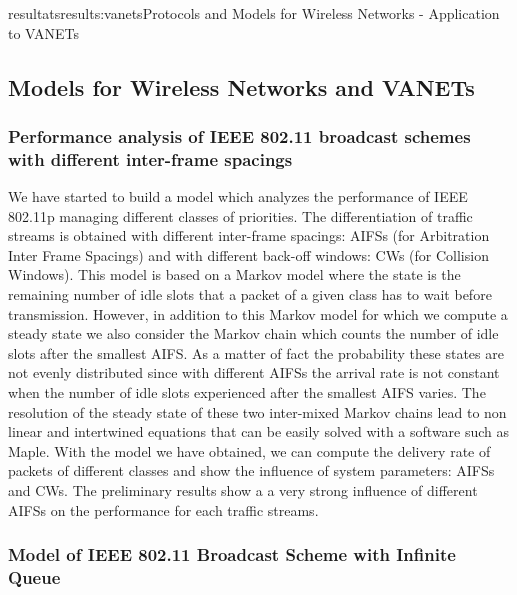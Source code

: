 \documentclass{ra2016}
\begin{document}
\begin{module}{resultats}{results:vanets}{Protocols and Models for Wireless Networks - Application to VANETs}
\subsection{Models for Wireless Networks and VANETs}


\subsubsection{Performance analysis of IEEE 802.11 broadcast schemes with different inter-frame spacings}

\begin{participants}
\end{participants}

We have started to build a model which analyzes the performance 
of IEEE 802.11p managing different classes of priorities. 
The differentiation of traffic streams is obtained with different 
inter-frame spacings:  AIFSs (for Arbitration Inter Frame Spacings) and with 
different back-off windows: CWs (for Collision Windows). 
This model is based on a Markov model where the state is the remaining 
number of idle slots that a packet of a given class has to wait before transmission. 
However, in addition to this Markov model for which we compute a steady state 
we also consider the Markov chain which counts the number of idle slots after 
the smallest AIFS. As a matter of fact the probability these states are not evenly 
distributed since with different AIFSs the arrival rate is not constant 
when the number of idle slots experienced after the smallest AIFS varies. 
The resolution of the steady state of these two inter-mixed Markov chains
lead to non linear and intertwined equations that can be easily  solved with a software 
such as Maple. 
With the model we have obtained, we can compute the delivery rate 
of packets of different classes and show the influence of system parameters: 
AIFSs and CWs. The preliminary results show a a very strong influence 
of different AIFSs on the performance for each traffic streams.  

\subsubsection{Model of IEEE 802.11 Broadcast Scheme with Infinite Queue}


\end{module}
\end{document}
